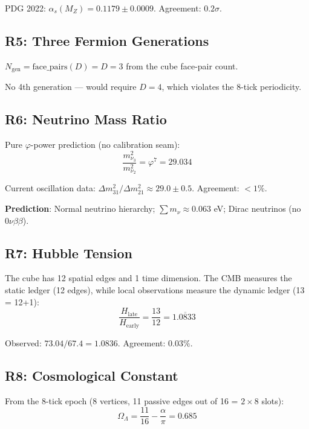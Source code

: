 \documentclass[12pt,twocolumn]{article}
\begin{document}
PDG 2022: $\alpha_s(M_Z) = 0.1179 \pm 0.0009$. Agreement: $0.2\sigma$.

\subsection{R5: Three Fermion Generations}

$N_\mathrm{gen} = \mathrm{face\_pairs}(D) = D = 3$ from the cube face-pair count.

No 4th generation — would require $D = 4$, which violates the 8-tick periodicity.

\subsection{R6: Neutrino Mass Ratio}

Pure $\varphi$-power prediction (no calibration seam):
\begin{equation}
\frac{m_{\nu_3}^2}{m_{\nu_2}^2} = \varphi^7 = 29.034
\end{equation}

Current oscillation data: $\Delta m^2_{31}/\Delta m^2_{21} \approx 29.0 \pm 0.5$.
Agreement: $< 1\%$.

\textbf{Prediction}: Normal neutrino hierarchy; $\sum m_\nu \approx 0.063$ eV; 
Dirac neutrinos (no $0\nu\beta\beta$).

\subsection{R7: Hubble Tension}

The cube has 12 spatial edges and 1 time dimension. The CMB measures the static ledger 
(12 edges), while local observations measure the dynamic ledger (13 = 12+1):
\begin{equation}
\frac{H_\mathrm{late}}{H_\mathrm{early}} = \frac{13}{12} = 1.0\overline{8}33
\end{equation}

Observed: $73.04/67.4 = 1.0836$. Agreement: $0.03\%$.

\subsection{R8: Cosmological Constant}

From the 8-tick epoch (8 vertices, 11 passive edges out of 16 = $2\times 8$ slots):
\begin{equation}
\Omega_\Lambda = \frac{11}{16} - \frac{\alpha}{\pi} = 0.685
\end{equation}
\end{document}
